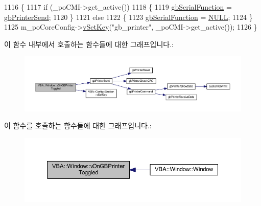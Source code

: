 \begin{DoxyCode}
1116 \{
1117   \textcolor{keywordflow}{if} (\_poCMI->get\_active())
1118   \{
1119     \mbox{\hyperlink{gb_globals_8cpp_a824d706a8d4285ee024bfd05a69e47e4}{gbSerialFunction}} = \mbox{\hyperlink{gb_printer_8cpp_ad92e246f72a463f50f3c0856418e087e}{gbPrinterSend}};
1120   \}
1121   \textcolor{keywordflow}{else}
1122   \{
1123     \mbox{\hyperlink{gb_globals_8cpp_a824d706a8d4285ee024bfd05a69e47e4}{gbSerialFunction}} = \mbox{\hyperlink{getopt1_8c_a070d2ce7b6bb7e5c05602aa8c308d0c4}{NULL}};
1124   \}
1125   m\_poCoreConfig->\mbox{\hyperlink{class_v_b_a_1_1_config_1_1_section_a57e1b95cbea40db71c093381beff4b0e}{vSetKey}}(\textcolor{stringliteral}{"gb\_printer"}, \_poCMI->get\_active());
1126 \}
\end{DoxyCode}
이 함수 내부에서 호출하는 함수들에 대한 그래프입니다.\+:
\nopagebreak
\begin{figure}[H]
\begin{center}
\leavevmode
\includegraphics[width=350pt]{class_v_b_a_1_1_window_a2d6e4c0bd7467305b02bd6f5b0343f26_cgraph}
\end{center}
\end{figure}
이 함수를 호출하는 함수들에 대한 그래프입니다.\+:
\nopagebreak
\begin{figure}[H]
\begin{center}
\leavevmode
\includegraphics[width=350pt]{class_v_b_a_1_1_window_a2d6e4c0bd7467305b02bd6f5b0343f26_icgraph}
\end{center}
\end{figure}
\mbox{\label{class_v_b_a_1_1_window_add1f8eb55cc9523cfdb6dbc3b9fbf4cf}} 
